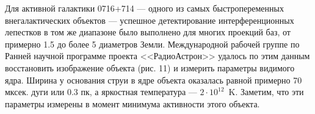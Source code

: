 Для активной галактики 0716+714 --- одного из самых быстропеременных внегалактических объектов ---
успешное детектирование интерференционных лепестков в том же диапазоне было выполнено для многих
проекций баз, от примерно 1.5 до более 5 диаметров Земли. Международной рабочей группе по Ранней
научной программе проекта <<РадиоАстрон>> удалось по этим данным восстановить изображение объекта
(рис. 11) и измерить параметры видимого ядра. Ширина у основания струи в ядре объекта оказалась
равной примерно 70 мксек. дуги или 0.3 пк, а яркостная температура --- $2 \cdot 10^{12}$~K. Заметим,
что эти параметры измерены в момент минимума активности этого объекта.

\begin{figure}[]
\end{figure}
